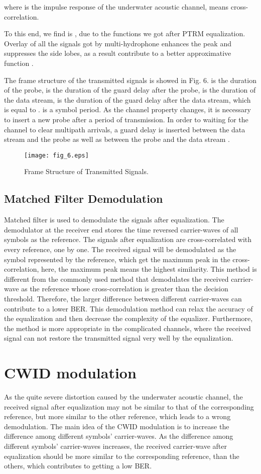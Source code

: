 \documentclass[journal]{IEEEtran}
\begin{document}
where  is the impulse response of the underwater acoustic
channel,  means cross-correlation.



To this end, we find  is , due to the 
functions we got after PTRM equalization. Overlay of all the signals
got by multi-hydrophone enhances the peak and suppresses the side
lobes, as a result contribute to a better approximative 
function \cite{Rouseff2001}.

The frame structure of the transmitted signals is showed in Fig. 6.
 is the duration of the probe,  is the duration of the
guard delay after the probe,  is the duration of the data
stream,  is the duration of the guard delay after the data
stream, which is equal to .  is a symbol period. As the
channel property changes, it is necessary to insert a new probe
after a period of transmission. In order to waiting for the channel
to clear multipath arrivals, a guard delay is inserted between the
data stream and the probe as well as between the probe and the data
stream \cite{Rouseff2001,Yin2008}.
\begin{figure}[!t]
\centering
\texttt{[image: fig\_6.eps]}
\caption{Frame Structure of Transmitted Signals.} \label{fig_sim}
\end{figure}
\subsection{Matched Filter Demodulation}
Matched filter is used to demodulate the signals after equalization.
The demodulator at the receiver end stores the time reversed
carrier-waves of all symbols as the reference. The signals after
equalization are cross-correlated with every reference, one by one.
The received signal will be demodulated as the symbol represented by
the reference, which get the maximum peak in the cross-correlation,
here, the maximum peak means the highest similarity. This method is
different from the commonly used method that demodulates the
received carrier-wave as the reference whose cross-correlation is
greater than the decision threshold. Therefore, the larger
difference between different carrier-waves can contribute to a lower
BER. This demodulation method can relax the accuracy of the
equalization and then decrease the complexity of the equalizer.
Furthermore, the method is more appropriate in the complicated
channels, where the received signal can not restore the transmitted
signal very well by the equalization.
\section{CWID modulation}
As the quite severe distortion caused by the underwater acoustic
channel, the received signal after equalization may not be similar
to that of the corresponding reference, but more similar to the
other reference, which leads to a wrong demodulation. The main idea
of the CWID modulation is to increase the difference among different
symbols' carrier-waves. As the difference among different symbols'
carrier-waves increases, the received carrier-wave after
equalization should be more similar to the corresponding reference,
than the others, which contributes to getting a low BER.
\end{document}
